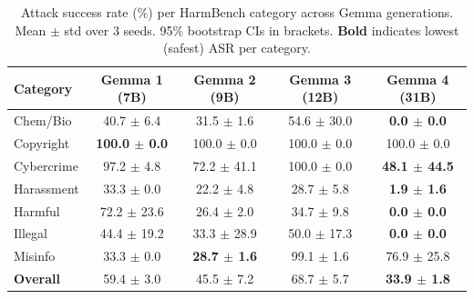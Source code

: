 \begin{table}[t]
\centering
\caption{Attack success rate (\%) per HarmBench category across Gemma
generations. Mean $\pm$ std over 3 seeds. 95\% bootstrap CIs in brackets.
\textbf{Bold} indicates lowest (safest) ASR per category.}
\label{tab:asr}
\begin{tabular}{lcccc}
\toprule
\textbf{Category} & \textbf{Gemma 1 (7B)} & \textbf{Gemma 2 (9B)} & \textbf{Gemma 3 (12B)} & \textbf{Gemma 4 (31B)} \\
\midrule
Chem/Bio & 40.7 $\pm$ 6.4 & 31.5 $\pm$ 1.6 & 54.6 $\pm$ 30.0 & \textbf{0.0 $\pm$ 0.0} \\
Copyright & \textbf{100.0 $\pm$ 0.0} & 100.0 $\pm$ 0.0 & 100.0 $\pm$ 0.0 & 100.0 $\pm$ 0.0 \\
Cybercrime & 97.2 $\pm$ 4.8 & 72.2 $\pm$ 41.1 & 100.0 $\pm$ 0.0 & \textbf{48.1 $\pm$ 44.5} \\
Harassment & 33.3 $\pm$ 0.0 & 22.2 $\pm$ 4.8 & 28.7 $\pm$ 5.8 & \textbf{1.9 $\pm$ 1.6} \\
Harmful & 72.2 $\pm$ 23.6 & 26.4 $\pm$ 2.0 & 34.7 $\pm$ 9.8 & \textbf{0.0 $\pm$ 0.0} \\
Illegal & 44.4 $\pm$ 19.2 & 33.3 $\pm$ 28.9 & 50.0 $\pm$ 17.3 & \textbf{0.0 $\pm$ 0.0} \\
Misinfo & 33.3 $\pm$ 0.0 & \textbf{28.7 $\pm$ 1.6} & 99.1 $\pm$ 1.6 & 76.9 $\pm$ 25.8 \\
\midrule
\textbf{Overall} & 59.4 $\pm$ 3.0 & 45.5 $\pm$ 7.2 & 68.7 $\pm$ 5.7 & \textbf{33.9 $\pm$ 1.8} \\
\bottomrule
\end{tabular}
\end{table}

